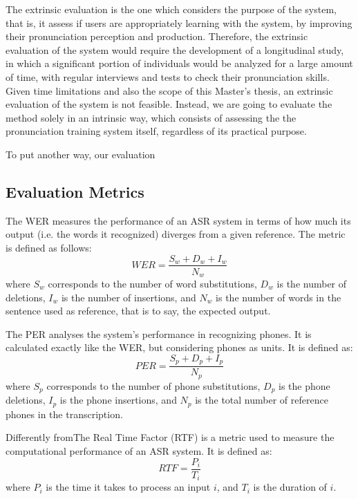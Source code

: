 The extrinsic evaluation is the one which considers the purpose of the system, that is,
it assess if users are appropriately learning with the system, by improving their 
pronunciation perception and production. Therefore, the extrinsic evaluation of the
system would require the development of a longitudinal study, in which a significant 
portion of individuals would be analyzed for a large amount of time, with regular interviews
and tests to check their pronunciation skills. Given time limitations and also the scope
of this Master's thesis, an extrinsic evaluation of the system is not feasible. Instead, we 
are going to evaluate the method solely in an intrinsic way, which consists 
of assessing the the pronunciation training system itself, regardless of its practical purpose.

To put another way, our evaluation 

\subsection{Evaluation Metrics}

The \ac{WER} measures the performance of an \ac{ASR} system in terms of how
much its output (i.e. the words it recognized) diverges from a given reference. The metric
is defined as follows:
\begin{equation}
 \textit{WER}=\frac{S_w+D_w+I_w}{N_w}
\end{equation}
where $S_w$ corresponds to the number of word substitutions, $D_w$ is the number of deletions, 
$I_w$ is the number of insertions, and $N_w$ is the number of words in the sentence used
as reference, that is to say, the expected output.

The \ac{PER} analyses the system's performance in recognizing phones. It
is calculated exactly like the \ac{WER}, but considering phones as units. It is defined as:
\begin{equation}
 \textit{PER}=\frac{S_p+D_p+I_p}{N_p}
\end{equation}
where $S_p$ corresponds to the number of phone substitutions, $D_p$ is the phone deletions, 
$I_p$ is the phone insertions, and $N_p$ is the total number of reference phones in 
the transcription.

Differently fromThe Real Time Factor (\ac{RTF}) is a metric used to measure the computational performance of 
an \ac{ASR} system. It is defined as:
\begin{equation}
 \textit{RTF}=\frac{P_i}{T_i}
\end{equation}
where $P_i$ is the time it takes to process an input $i$, and $T_i$ is the duration of $i$.

